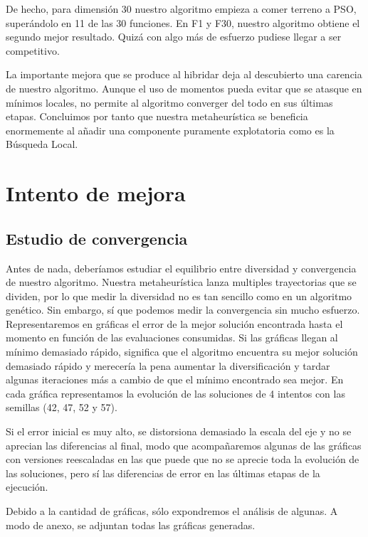 \documentclass{article}
\begin{document}
De hecho, para dimensión 30 nuestro algoritmo empieza a comer terreno a PSO, superándolo en 11 de las 30 funciones. En F1 y F30, nuestro
algoritmo obtiene el segundo mejor resultado. Quizá con algo más de esfuerzo pudiese llegar a ser competitivo.

La importante mejora que se produce al hibridar deja al descubierto una carencia de nuestro algoritmo. Aunque el uso de momentos pueda
evitar que se atasque en mínimos locales, no permite al algoritmo converger del todo en sus últimas etapas. Concluimos por tanto que
nuestra metaheurística se beneficia enormemente al añadir una componente puramente explotatoria como es la Búsqueda Local.

\pagebreak

\section{Intento de mejora}

\subsection{Estudio de convergencia}

Antes de nada, deberíamos estudiar el equilibrio entre diversidad y convergencia de nuestro algoritmo. Nuestra metaheurística lanza multiples trayectorias
que se dividen, por lo que medir la diversidad no es tan sencillo como en un algoritmo genético. Sin embargo, sí que podemos medir
la convergencia sin mucho esfuerzo. Representaremos en gráficas el error de la mejor solución encontrada hasta el momento
en función de las evaluaciones consumidas. Si las gráficas llegan al mínimo demasiado rápido, significa que el algoritmo
encuentra su mejor solución demasiado rápido y merecería la pena aumentar la diversificación y tardar algunas iteraciones
más a cambio de que el mínimo encontrado sea mejor. En cada gráfica representamos la evolución de las soluciones de 4 intentos
con las semillas (42, 47, 52 y 57).

Si el error inicial es muy alto, se distorsiona demasiado la escala del eje y no se aprecian las diferencias al final, modo que acompañaremos
algunas de las gráficas con versiones reescaladas en las que puede que no se aprecie toda la evolución de las soluciones, pero sí las diferencias de
error en las últimas etapas de la ejecución.

Debido a la cantidad de gráficas, sólo expondremos el análisis de algunas. A modo de anexo, se adjuntan todas las gráficas generadas.
\end{document}
